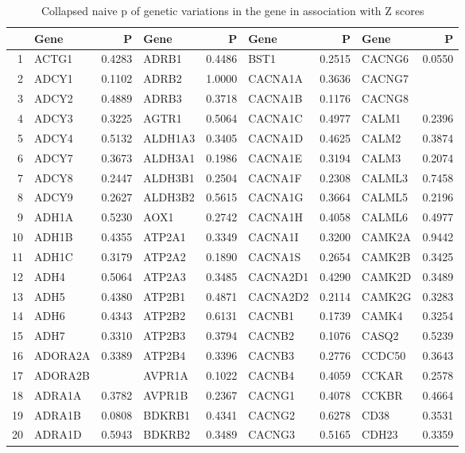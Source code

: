 \documentclass{article}
\begin{document}
\begin{table}[tbp]
\centering
\caption{Collapsed naive p of genetic variations in the gene in association with Z scores} 
\label{tab:lowP}
{\small
\begin{tabular}{rlrlrlrlr}
  \hline
 & Gene & P & Gene & P & Gene & P & Gene & P \\ 
  \hline
1 & ACTG1 & 0.4283 & ADRB1 & 0.4486 & BST1 & 0.2515 & CACNG6 & 0.0550 \\ 
  2 & ADCY1 & 0.1102 & ADRB2 & 1.0000 & CACNA1A & 0.3636 & CACNG7 &  \\ 
  3 & ADCY2 & 0.4889 & ADRB3 & 0.3718 & CACNA1B & 0.1176 & CACNG8 &  \\ 
  4 & ADCY3 & 0.3225 & AGTR1 & 0.5064 & CACNA1C & 0.4977 & CALM1 & 0.2396 \\ 
  5 & ADCY4 & 0.5132 & ALDH1A3 & 0.3405 & CACNA1D & 0.4625 & CALM2 & 0.3874 \\ 
  6 & ADCY7 & 0.3673 & ALDH3A1 & 0.1986 & CACNA1E & 0.3194 & CALM3 & 0.2074 \\ 
  7 & ADCY8 & 0.2447 & ALDH3B1 & 0.2504 & CACNA1F & 0.2308 & CALML3 & 0.7458 \\ 
  8 & ADCY9 & 0.2627 & ALDH3B2 & 0.5615 & CACNA1G & 0.3664 & CALML5 & 0.2196 \\ 
  9 & ADH1A & 0.5230 & AOX1 & 0.2742 & CACNA1H & 0.4058 & CALML6 & 0.4977 \\ 
  10 & ADH1B & 0.4355 & ATP2A1 & 0.3349 & CACNA1I & 0.3200 & CAMK2A & 0.9442 \\ 
  11 & ADH1C & 0.3179 & ATP2A2 & 0.1890 & CACNA1S & 0.2654 & CAMK2B & 0.3425 \\ 
  12 & ADH4 & 0.5064 & ATP2A3 & 0.3485 & CACNA2D1 & 0.4290 & CAMK2D & 0.3489 \\ 
  13 & ADH5 & 0.4380 & ATP2B1 & 0.4871 & CACNA2D2 & 0.2114 & CAMK2G & 0.3283 \\ 
  14 & ADH6 & 0.4343 & ATP2B2 & 0.6131 & CACNB1 & 0.1739 & CAMK4 & 0.3254 \\ 
  15 & ADH7 & 0.3310 & ATP2B3 & 0.3794 & CACNB2 & 0.1076 & CASQ2 & 0.5239 \\ 
  16 & ADORA2A & 0.3389 & ATP2B4 & 0.3396 & CACNB3 & 0.2776 & CCDC50 & 0.3643 \\ 
  17 & ADORA2B &  & AVPR1A & 0.1022 & CACNB4 & 0.4059 & CCKAR & 0.2578 \\ 
  18 & ADRA1A & 0.3782 & AVPR1B & 0.2367 & CACNG1 & 0.4078 & CCKBR & 0.4664 \\ 
  19 & ADRA1B & 0.0808 & BDKRB1 & 0.4341 & CACNG2 & 0.6278 & CD38 & 0.3531 \\ 
  20 & ADRA1D & 0.5943 & BDKRB2 & 0.3489 & CACNG3 & 0.5165 & CDH23 & 0.3359 \\ 
   \hline
\end{tabular}
}
\end{table}
\end{document}

